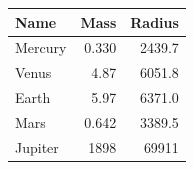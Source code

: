 \begin{tabular}{lrr}
\toprule
Name & Mass & Radius \\
\midrule
Mercury & 0.330 & 2439.7 \\
Venus & 4.87 & 6051.8 \\
Earth & 5.97 & 6371.0 \\
Mars & 0.642 & 3389.5 \\
Jupiter & 1898 & 69911 \\
\bottomrule
\end{tabular}

